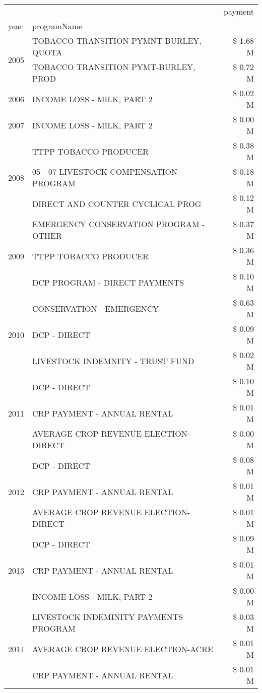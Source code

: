 \begin{tabular}{llr}
\toprule
 &  & payment \\
year & programName &  \\
\midrule
\multirow[t]{2}{*}{2005} & TOBACCO TRANSITION PYMNT-BURLEY, QUOTA & \$ 1.68 M \\
 & TOBACCO TRANSITION PYMT-BURLEY, PROD & \$ 0.72 M \\
\cline{1-3}
2006 & INCOME LOSS - MILK, PART 2 & \$ 0.02 M \\
\cline{1-3}
2007 & INCOME LOSS - MILK, PART 2 & \$ 0.00 M \\
\cline{1-3}
\multirow[t]{3}{*}{2008} & TTPP TOBACCO PRODUCER & \$ 0.38 M \\
 & 05 - 07 LIVESTOCK COMPENSATION PROGRAM & \$ 0.18 M \\
 & DIRECT AND COUNTER CYCLICAL PROG & \$ 0.12 M \\
\cline{1-3}
\multirow[t]{3}{*}{2009} & EMERGENCY CONSERVATION PROGRAM - OTHER & \$ 0.37 M \\
 & TTPP TOBACCO PRODUCER & \$ 0.36 M \\
 & DCP PROGRAM - DIRECT PAYMENTS & \$ 0.10 M \\
\cline{1-3}
\multirow[t]{3}{*}{2010} & CONSERVATION - EMERGENCY & \$ 0.63 M \\
 & DCP - DIRECT & \$ 0.09 M \\
 & LIVESTOCK INDEMNITY - TRUST FUND & \$ 0.02 M \\
\cline{1-3}
\multirow[t]{3}{*}{2011} & DCP - DIRECT & \$ 0.10 M \\
 & CRP PAYMENT - ANNUAL RENTAL & \$ 0.01 M \\
 & AVERAGE CROP REVENUE ELECTION-DIRECT & \$ 0.00 M \\
\cline{1-3}
\multirow[t]{3}{*}{2012} & DCP - DIRECT & \$ 0.08 M \\
 & CRP PAYMENT - ANNUAL RENTAL & \$ 0.01 M \\
 & AVERAGE CROP REVENUE ELECTION-DIRECT & \$ 0.01 M \\
\cline{1-3}
\multirow[t]{3}{*}{2013} & DCP - DIRECT & \$ 0.09 M \\
 & CRP PAYMENT - ANNUAL RENTAL & \$ 0.01 M \\
 & INCOME LOSS - MILK, PART 2 & \$ 0.00 M \\
\cline{1-3}
\multirow[t]{3}{*}{2014} & LIVESTOCK INDEMINITY PAYMENTS PROGRAM & \$ 0.03 M \\
 & AVERAGE CROP REVENUE ELECTION-ACRE & \$ 0.01 M \\
 & CRP PAYMENT - ANNUAL RENTAL & \$ 0.01 M \\

\end{tabular}
